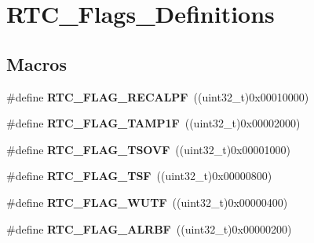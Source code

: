\hypertarget{group___r_t_c___flags___definitions}{}\section{R\+T\+C\+\_\+\+Flags\+\_\+\+Definitions}
\label{group___r_t_c___flags___definitions}
\subsection*{Macros}
\begin{DoxyCompactItemize}
\item 
\hypertarget{group___r_t_c___flags___definitions_ga01cba90a7ca51a928f72d28b6fe0d2ac}{}\#define {\bfseries R\+T\+C\+\_\+\+F\+L\+A\+G\+\_\+\+R\+E\+C\+A\+L\+P\+F}~((uint32\+\_\+t)0x00010000)\label{group___r_t_c___flags___definitions_ga01cba90a7ca51a928f72d28b6fe0d2ac}

\item 
\hypertarget{group___r_t_c___flags___definitions_ga3abf1af75c6ae88ddabe4b8a26634f99}{}\#define {\bfseries R\+T\+C\+\_\+\+F\+L\+A\+G\+\_\+\+T\+A\+M\+P1\+F}~((uint32\+\_\+t)0x00002000)\label{group___r_t_c___flags___definitions_ga3abf1af75c6ae88ddabe4b8a26634f99}

\item 
\hypertarget{group___r_t_c___flags___definitions_ga74656ea8ff41be61a3734dc27367e039}{}\#define {\bfseries R\+T\+C\+\_\+\+F\+L\+A\+G\+\_\+\+T\+S\+O\+V\+F}~((uint32\+\_\+t)0x00001000)\label{group___r_t_c___flags___definitions_ga74656ea8ff41be61a3734dc27367e039}

\item 
\hypertarget{group___r_t_c___flags___definitions_ga9b9ac7de7718bfe0ff77e1fd1193744b}{}\#define {\bfseries R\+T\+C\+\_\+\+F\+L\+A\+G\+\_\+\+T\+S\+F}~((uint32\+\_\+t)0x00000800)\label{group___r_t_c___flags___definitions_ga9b9ac7de7718bfe0ff77e1fd1193744b}

\item 
\hypertarget{group___r_t_c___flags___definitions_gafcadab331b0193e82c7f6b037044f194}{}\#define {\bfseries R\+T\+C\+\_\+\+F\+L\+A\+G\+\_\+\+W\+U\+T\+F}~((uint32\+\_\+t)0x00000400)\label{group___r_t_c___flags___definitions_gafcadab331b0193e82c7f6b037044f194}

\item 
\hypertarget{group___r_t_c___flags___definitions_gabb7bd65e83b346f42e28091ef1e643f5}{}\#define {\bfseries R\+T\+C\+\_\+\+F\+L\+A\+G\+\_\+\+A\+L\+R\+B\+F}~((uint32\+\_\+t)0x00000200)\label{group___r_t_c___flags___definitions_gabb7bd65e83b346f42e28091ef1e643f5}


\end{DoxyCompactItemize}
